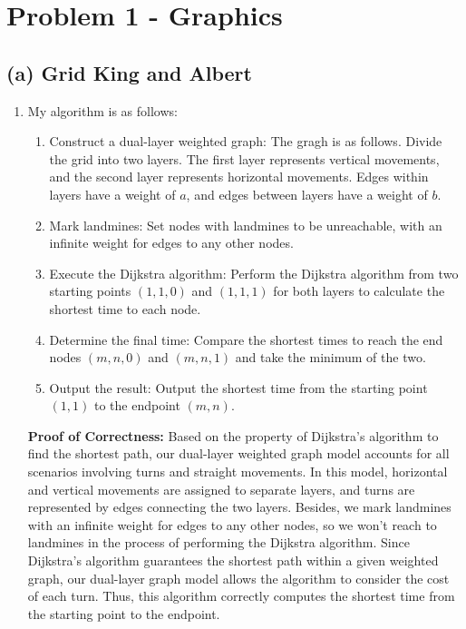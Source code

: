 \documentclass[letterpaper, 11pt]{article}
\newcommand{\1}{\mathds{1}}	%
\theoremstyle{definition}
\begin{document}
\section*{Problem 1 - Graphics}
\subsection*{(a) Grid King and Albert}
\begin{enumerate}[label=\arabic*., leftmargin=*, align=left, itemindent=0pt]
  \item My algorithm is as follows:
  \begin{enumerate}
    \item Construct a dual-layer weighted graph:
    The gragh is as follows. Divide the grid into two layers. 
    The first layer represents vertical movements, 
    and the second layer represents horizontal movements. 
    Edges within layers have a weight of \(a\), and edges between layers have a weight of \(b\).
    \item Mark landmines: Set nodes with landmines to be unreachable, 
    with an infinite weight for edges to any other nodes.
    \item Execute the Dijkstra algorithm: 
    Perform the Dijkstra algorithm from two starting points \((1,1,0)\) and \((1,1,1)\) 
    for both layers to calculate the shortest time to each node.
    \item Determine the final time: 
    Compare the shortest times to reach the end nodes \((m,n,0)\) and \((m,n,1)\) and take the minimum of the two.
    \item Output the result: 
    Output the shortest time from the starting point \((1,1)\) to the endpoint \((m,n)\).
\end{enumerate}

        \textbf{Proof of Correctness:} Based on the property of Dijkstra's algorithm to find the shortest path, 
        our dual-layer weighted graph model accounts for all scenarios involving turns and straight movements.
        In this model, horizontal and vertical movements are assigned to separate layers, 
        and turns are represented by edges connecting the two layers. 
        Besides, we mark landmines with an infinite weight for edges to any other nodes, 
        so we won't reach to landmines in the process of performing the Dijkstra algorithm.
        Since Dijkstra's algorithm guarantees the shortest path within a given weighted graph, 
        our dual-layer graph model allows the algorithm to consider the cost of each turn. 
        Thus, this algorithm correctly computes the shortest time from the starting point to the endpoint.


\end{enumerate}
\end{document}
